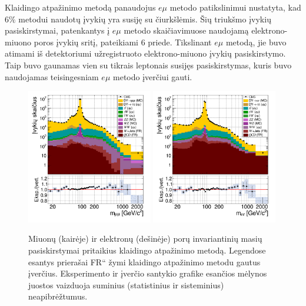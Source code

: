 \documentclass[a4paper, 12pt, oneside]{article}
\newcommand{\emu}{e\mu}
\newcommand{\ltq}[1]{{\quotedblbase{}#1\textquotedblleft{}}}
\newlength\q
\begin{document}
Klaidingo atpažinimo metodą panaudojus $\emu$ metodo patikslinimui nustatyta, kad $6\%$ metodui naudotų įvykių yra susiję su
čiurkšlėmis.
Šių triukšmo įvykių pasiskirstymai, patenkantys į $\emu$ metodo skaičiavimuose naudojamą elektrono-miuono poros įvykių
sritį, pateikiami 6 priede.
Tikslinant $\emu$ metodą, jie buvo atimami iš detektoriumi užregistruoto elektrono-miuono įvykių pasiskirstymo.
Taip buvo gaunamas vien su tikrais leptonais susijęs pasiskirstymas, kuris buvo naudojamas teisingesniam $\emu$ metodo įverčiui gauti.

\begin{figure}[b!]
	\includegraphics[width=0.49\textwidth]{Magistrinis/MuMumass_afterFR.png}
	\includegraphics[width=0.49\textwidth]{Magistrinis/EEmass_afterFR.png}
	\vspace{-0.3cm}
	\caption{\label{fig:MassFinal}
		Miuonų (kairėje) ir elektronų (dešinėje) porų invariantinių masių pasiskirstymai pritaikius klaidingo atpažinimo metodą.
		Legendose esantys prierašai \ltq{FR} žymi klaidingo atpažinimo metodu gautus įverčius.
		Eksperimento ir įverčio santykio grafike esančios mėlynos juostos vaizduoja suminius (statistinius ir sisteminius)
		neapibrėžtumus.}
\end{figure}
\end{document}
